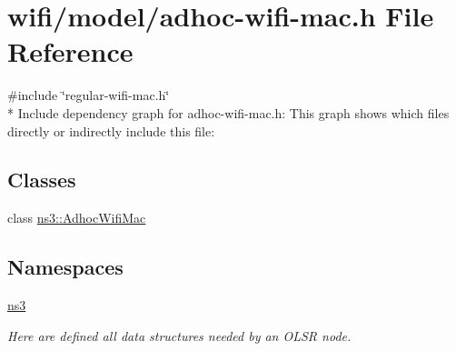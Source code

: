 \hypertarget{adhoc-wifi-mac_8h}{}\section{wifi/model/adhoc-\/wifi-\/mac.h File Reference}
\label{adhoc-wifi-mac_8h}
{\ttfamily \#include \char`\"{}regular-\/wifi-\/mac.\+h\char`\"{}}\\*
Include dependency graph for adhoc-\/wifi-\/mac.h\+:
This graph shows which files directly or indirectly include this file\+:
\subsection*{Classes}
\begin{DoxyCompactItemize}
\item 
class \hyperlink{classns3_1_1AdhocWifiMac}{ns3\+::\+Adhoc\+Wifi\+Mac}
\end{DoxyCompactItemize}
\subsection*{Namespaces}
\begin{DoxyCompactItemize}
\item 
 \hyperlink{namespacens3}{ns3}
\begin{DoxyCompactList}\small\item\em Here are defined all data structures needed by an O\+L\+SR node. \end{DoxyCompactList}\end{DoxyCompactItemize}
